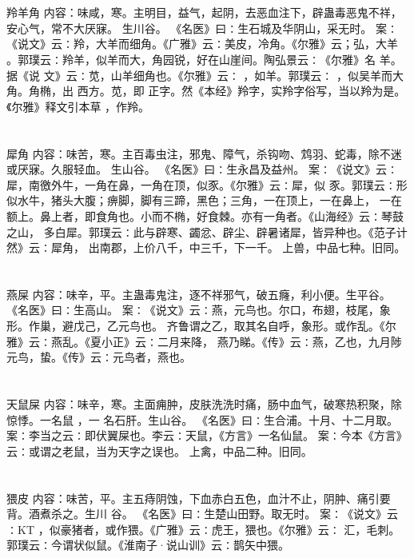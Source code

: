\documentclass[12pt,UTF8]{ctexbook}
\begin{document}
\chapter{}羚羊角
内容：味咸，寒。主明目，益气，起阴，去恶血注下，辟蛊毒恶鬼不祥，安心气，常不大厌寐。 
生川谷。 
《名医》曰∶生石城及华阴山，采无时。 
案∶《说文》云∶羚，大羊而细角。《广雅》云∶美皮，冷角。《尔雅》云；弘，大羊 
。郭璞云∶羚羊，似羊而大，角园锐，好在山崖间。陶弘景云∶《尔雅》名 羊。据《说 
文》云∶苋，山羊细角也。《尔雅》云∶ ，如羊。郭璞云∶ ，似吴羊而大角。角椭，出 
西方。苋，即 正字。然《本经》羚字，实羚字俗写，当以羚为是。《尔雅》释文引本草 
，作羚。 


\chapter{}犀角
内容：味苦，寒。主百毒虫注，邪鬼、障气，杀钩吻、鸩羽、蛇毒，除不迷或厌寐。久服轻血。 
生山谷。 
《名医》曰∶生永昌及益州。 
案∶《说文》云∶犀，南徼外牛，一角在鼻，一角在顶，似豕。《尔雅》云∶犀，似 
豕。郭璞云∶形似水牛，猪头大腹；痹脚，脚有三蹄，黑色；三角，一在顶上，一在鼻上， 
一在额上。鼻上者，即食角也。小而不椭，好食棘。亦有一角者。《山海经》云∶琴鼓之山， 
多白犀。郭璞云∶此与辟寒、蠲忿、辟尘、辟暑诸犀，皆异种也。《范子计然》云∶犀角， 
出南郡，上价八千，中三千，下一千。 
上兽，中品七种。旧同。 


\chapter{}燕屎
内容：味辛，平。主蛊毒鬼注，逐不祥邪气，破五癃，利小便。生平谷。 
《名医》曰∶生高山。 
案∶《说文》云∶燕，元鸟也。尔口，布翅，枝尾，象形。作巢，避戊己，乙元鸟也。 
齐鲁谓之乙，取其名自呼，象形。或作乱。《尔雅》云∶燕乱。《夏小正》云∶二月来降， 
燕乃睇。《传》云∶燕，乙也，九月陟元鸟，蛰。《传》云∶元鸟者，燕也。 


\chapter{}天鼠屎
内容：味辛，寒。主面痈肿，皮肤洗洗时痛，肠中血气，破寒热积聚，除惊悸。一名鼠 ，一 
名石肝。生山谷。 
《名医》曰∶生合浦。十月、十二月取。 
案∶李当之云∶即伏翼屎也。李云∶天鼠，《方言》一名仙鼠。 
案∶今本《方言》云∶或谓之老鼠，当为天字之误也。 
上禽，中品二种。旧同。 


\chapter{}猥皮
内容：味苦，平。主五痔阴蚀，下血赤白五色，血汁不止，阴肿、痛引要背。酒煮杀之。生川 
谷。 
《名医》曰∶生楚山田野。取无时。 
案∶《说文》云∶KT ，似豪猪者，或作猥。《广雅》云∶虎王，猥也。《尔雅》云∶ 
汇，毛刺。郭璞云∶今谓状似鼠。《淮南子·说山训》云∶鹊矢中猥。 
\end{document}
